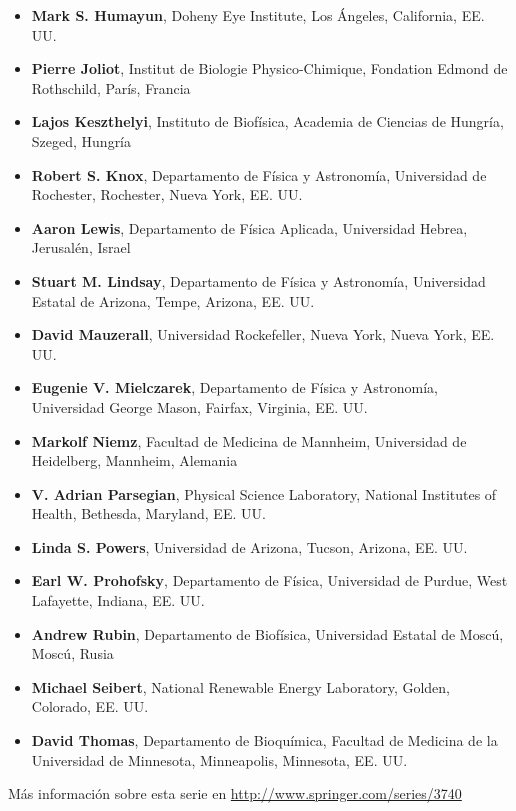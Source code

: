 ﻿\documentclass{book}
\begin{document}
\begin{small}
\begin{itemize}
    \item \textbf{Mark S. Humayun}, Doheny Eye Institute, Los Ángeles, California, EE. UU.
    \item \textbf{Pierre Joliot}, Institut de Biologie Physico-Chimique, Fondation Edmond de Rothschild, París, Francia
    \item \textbf{Lajos Keszthelyi}, Instituto de Biofísica, Academia de Ciencias de Hungría, Szeged, Hungría
    \item \textbf{Robert S. Knox}, Departamento de Física y Astronomía, Universidad de Rochester, Rochester, Nueva York, EE. UU.
    \item \textbf{Aaron Lewis}, Departamento de Física Aplicada, Universidad Hebrea, Jerusalén, Israel
    \item \textbf{Stuart M. Lindsay}, Departamento de Física y Astronomía, Universidad Estatal de Arizona, Tempe, Arizona, EE. UU.
    \item \textbf{David Mauzerall}, Universidad Rockefeller, Nueva York, Nueva York, EE. UU.
    \item \textbf{Eugenie V. Mielczarek}, Departamento de Física y Astronomía, Universidad George Mason, Fairfax, Virginia, EE. UU.
    \item \textbf{Markolf Niemz}, Facultad de Medicina de Mannheim, Universidad de Heidelberg, Mannheim, Alemania
    \item \textbf{V. Adrian Parsegian}, Physical Science Laboratory, National Institutes of Health, Bethesda, Maryland, EE. UU.
    \item \textbf{Linda S. Powers}, Universidad de Arizona, Tucson, Arizona, EE. UU.
    \item \textbf{Earl W. Prohofsky}, Departamento de Física, Universidad de Purdue, West Lafayette, Indiana, EE. UU.
    \item \textbf{Andrew Rubin}, Departamento de Biofísica, Universidad Estatal de Moscú, Moscú, Rusia
    \item \textbf{Michael Seibert}, National Renewable Energy Laboratory, Golden, Colorado, EE. UU.
    \item \textbf{David Thomas}, Departamento de Bioquímica, Facultad de Medicina de la Universidad de Minnesota, Minneapolis, Minnesota, EE. UU.
\end{itemize}
\end{small}

\vspace{1.5em}
\noindent Más información sobre esta serie en \url{http://www.springer.com/series/3740}
\clearpage
\end{document}

